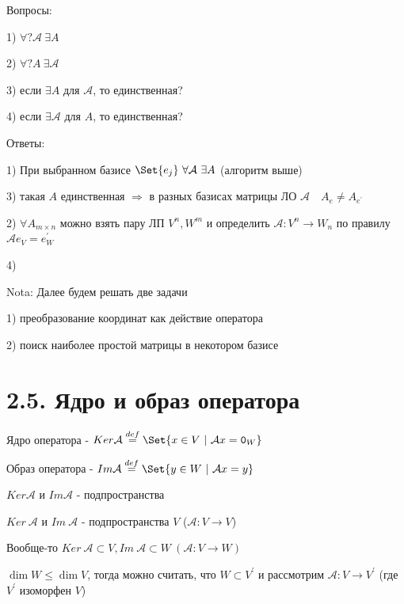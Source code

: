 \documentclass[12pt]{article}
\begin{document}
    Вопросы:

    1) $\forall ? \mathcal{A} \ \exists A$

    2) $\forall ? A \ \exists \mathcal{A}$

    3) если $\exists A$ для $\mathcal{A}$, то единственная?

    4) если $\exists \mathcal{A}$ для $A$, то единственная?

    Ответы:

    1) При выбранном базисе $\displaystyle \Set{e_j} \ \forall \mathcal{A} \ \exists A$ (алгоритм выше)

    3) такая $A$ единственная $\Longrightarrow$ в разных базисах матрицы ЛО $\displaystyle \mathcal{A} \quad A_e \neq A_{e^\prime}$

    2) $\displaystyle \forall A_{m\times n}$ можно взять пару ЛП $\displaystyle V^n, W^m$ и определить $\displaystyle \mathcal{A} : V^n \rightarrow W_n$ по правилу $\displaystyle \mathcal{A}e_V = e_W^\prime$

    4) \Lab

    Nota: Далее будем решать две задачи

    1) преобразование координат как действие оператора

    2) поиск наиболее простой матрицы в некотором базисе

    \section{2.5. Ядро и образ оператора}

    \Def Ядро оператора - $\displaystyle Ker \mathcal{A} \stackrel{def}{=} \Set{x \in V \ | \ \mathcal{A}x = \texttt{0}_W}$

    \Def Образ оператора - $Im \mathcal{A} \stackrel{def}{=} \Set{y \in W \ | \ \mathcal{A}x = y}$

    \Nota $Ker \mathcal{A}$ и $Im \mathcal{A}$ - подпространства



    \Nota $Ker\ \mathcal{A}$ и $Im\ \mathcal{A}$ - подпространства $V$ ($\mathcal{A} : V \rightarrow V$)

    Вообще-то $Ker\ \mathcal{A} \subset V, Im\ \mathcal{A} \subset W \ (\mathcal{A} : V \rightarrow W)$

    $\dim W \leq \dim V$, тогда можно считать, что $\displaystyle W \subset V^\prime$ и
    рассмотрим $\displaystyle \mathcal{A} : V \rightarrow V^\prime$ (где $\displaystyle V^\prime$ изоморфен $V$)
\end{document}
